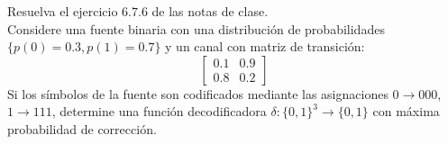 
Resuelva el ejercicio $6\text{.}7\text{.}6$ de las notas de clase.\\
Considere una fuente binaria con una distribución de probabilidades $\{p(0) = 0\text{.}3, p(1) = 0\text{.}7\}$ y un canal con matriz de transición:
\begin{equation*}
    \begin{bmatrix} 0\text{.}1 & 0\text{.}9 \\ 0\text{.}8 & 0\text{.}2 \end{bmatrix}
\end{equation*}
Si los símbolos de la fuente son codificados mediante las asignaciones $0 \to 000$, $1 \to 111$, determine una función decodificadora $\delta: \{0,1\}^3 \to \{0,1\}$ con máxima probabilidad de corrección.
